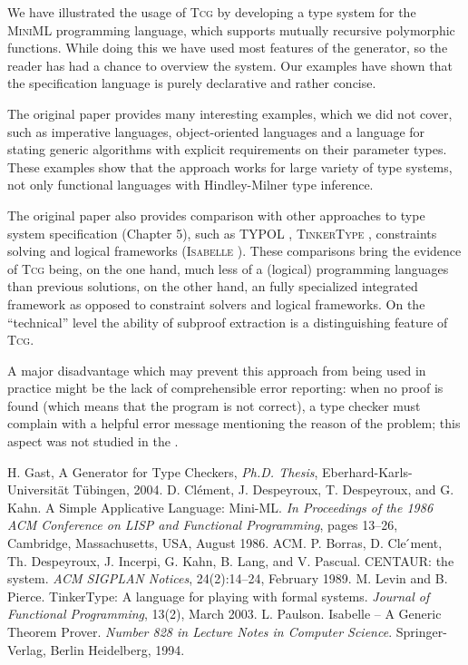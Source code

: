 \documentclass[a4paper,12pt]{article}
\newcommand{\Tcg}{\textsc{Tcg}}
\begin{document}
We have illustrated the usage of \Tcg{} by developing a type system for the \textsc{MiniML} programming language, which supports mutually recursive polymorphic functions. While doing this we have used most features of the generator, so the reader has had a chance to overview the system. Our examples have shown that the specification language is purely declarative and rather concise.

The original paper \cite{Tcg} provides many interesting examples, which we did not cover, such as imperative languages, object-oriented languages and a language for stating generic algorithms with explicit requirements on their parameter types. These examples show that the approach works for large variety of type systems, not only functional languages with Hindley-Milner type inference. 

The original paper also provides comparison with other approaches to type system specification (Chapter 5), such as TYPOL \cite{Typol}, \textsc{TinkerType} \cite{Tinker}, constraints solving and logical frameworks (\textsc{Isabelle} \cite{Isabelle}). These comparisons bring the evidence of \Tcg{} being, on the one hand, much less of a (logical) programming languages than previous solutions, on the other hand,  an fully specialized integrated framework as opposed to constraint solvers and logical frameworks. On the ``technical'' level the ability of subproof extraction is a distinguishing feature of \Tcg{}.

A major disadvantage which may prevent this approach from being used in practice might be the lack of comprehensible error reporting: when no proof is found (which means that the program is not correct), a type checker must complain with a helpful error message mentioning the reason of the problem; this aspect was not studied in the \cite{Tcg}.

\begin{thebibliography}{99}
	 H. Gast, A Generator for Type Checkers, \textit{Ph.D. Thesis}, Eberhard-Karls-Universit\"at T\"ubingen, 2004.
	 D. Cl\'{e}ment, J. Despeyroux, T. Despeyroux, and G. Kahn. A Simple Applicative Language: Mini-ML. \textit{In Proceedings of the 1986 ACM Conference on LISP and Functional Programming}, pages 13–26, Cambridge, Massachusetts, USA, August 1986. ACM.
	 P. Borras, D. Cle ́ment, Th. Despeyroux, J. Incerpi, G. Kahn, B. Lang, and V. Pascual. CENTAUR: the system. \textit{ACM SIGPLAN Notices}, 24(2):14–24, February 1989.
	 M. Levin and B. Pierce. TinkerType: A language for playing with formal systems. \textit{Journal of Functional Programming}, 13(2), March 2003.
	 L. Paulson. Isabelle – A Generic Theorem Prover. \textit{Number 828 in Lecture Notes in Computer Science}. Springer-Verlag, Berlin Heidelberg, 1994.
\end{thebibliography}
\end{document}
